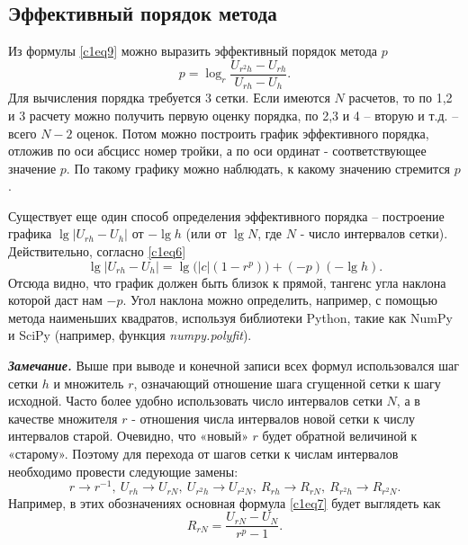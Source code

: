 \documentclass{article}
\begin{document}
\subsection*{Эффективный порядок метода}
Из формулы \eqref{c1eq9} можно выразить эффективный порядок метода $p$
\begin{equation} \label{c1eq13}
	p = \log_r \frac{U_{r^2h} - U_{rh}}{U_{rh} - U_h}.
\end{equation}
Для вычисления порядка требуется 3 сетки. Если имеются $N$ расчетов, то по 1,2 и 3 расчету можно получить первую оценку порядка, по 2,3 и 4 – вторую и т.д. – всего $N-2$ оценок. Потом можно построить график эффективного порядка, отложив по оси абсцисс номер тройки, а по оси ординат - соответствующее значение $p$. По такому графику можно наблюдать, к какому значению стремится $p$.

Существует еще один способ определения эффективного порядка – построение графика $\lg\left| U_{rh} - U_h \right|$ от $-\lg h$ (или от $\lg N$, где $N$ - число интервалов сетки). Действительно, согласно \eqref{c1eq6}
\begin{equation} \label{c1eq14}
	\lg \left| U_{rh} - U_h \right| = \lg \big( \left| c \right| \left( 1 - r^p \right) \big) + \left( -p \right) \left( - \lg h \right).
\end{equation}
Отсюда видно, что график должен быть близок к прямой, тангенс угла наклона которой даст нам $-p$. Угол наклона можно определить, например, с помощью метода наименьших квадратов, используя библиотеки Python, такие как NumPy и SciPy (например, функция \textit{numpy.polyfit}).

\textit{\textbf{Замечание.}} Выше при выводе и конечной записи всех формул использовался шаг сетки $h$ и множитель $r$, означающий отношение шага сгущенной сетки к шагу исходной. Часто более удобно использовать число интервалов сетки $N$, а в качестве множителя $r$ - отношения числа интервалов новой сетки к числу интервалов старой. Очевидно, что «новый» $r$ будет обратной величиной к «старому». Поэтому для перехода от шагов сетки к  числам интервалов необходимо провести следующие замены:
\begin{equation} \label{c1eq15}
	r \rightarrow r^{-1}, \ U_{rh} \rightarrow U_{rN}, \ U_{r^2h} \rightarrow U_{r^2N}, \ R_{rh} \rightarrow R_{rN}, \ R_{r^2h} \rightarrow R_{r^2N}.
\end{equation}
Например, в этих обозначениях основная формула \eqref{c1eq7} будет выглядеть как
\begin{equation} \label{c1eq16}
	R_{rN} = \frac{U_{rN} - U_N}{r^p - 1}.
\end{equation}
\end{document}
